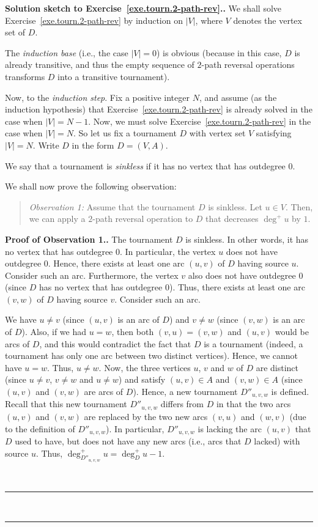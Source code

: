 \documentclass[numbers=enddot,12pt,final,onecolumn,notitlepage]{scrartcl}%
\theoremstyle{definition}
\newenvironment{statement}{\begin{quote}}{\end{quote}}
\newenvironment{proof}[1][Proof]{\noindent\textbf{#1.} }{\ \rule{0.5em}{0.5em}}
\newcommand{\abs}[1]{\left| #1 \right|}
\newcommand{\tup}[1]{\left( #1 \right)}
\begin{document}
\begin{proof}[Solution sketch to Exercise~\ref{exe.tourn.2-path-rev}.]
We shall solve Exercise~\ref{exe.tourn.2-path-rev} by induction on
$\abs{V}$, where $V$ denotes the vertex set of $D$.

The \textit{induction base} (i.e., the case $\abs{V} = 0$)
is obvious (because in this case, $D$ is already transitive, and thus
the empty sequence of $2$-path reversal operations transforms $D$ into
a transitive tournament).

Now, to the \textit{induction step}. Fix a positive
integer $N$, and assume (as the induction hypothesis) that
Exercise~\ref{exe.tourn.2-path-rev} is already solved in the case when
$\abs{V} = N-1$. Now, we must solve
Exercise~\ref{exe.tourn.2-path-rev} in the case when
$\abs{V} = N$. So let us fix a tournament $D$ with vertex set $V$
satisfying $\abs{V} = N$.
Write $D$ in the form $D = \tup{V, A}$.

We say that a tournament is \textit{sinkless} if it has no vertex that
has outdegree $0$.

We shall now prove the following observation:

\begin{statement}
\textit{Observation 1:} Assume that the tournament $D$ is sinkless.
Let $u \in V$. Then, we can apply a $2$-path reversal operation to $D$
that decreases $\deg^+ u$ by $1$.
\end{statement}
\begin{proof}[Proof of Observation 1.]
The tournament $D$ is sinkless. In other words, it has no vertex that
has outdegree $0$. In particular, the vertex $u$ does not have
outdegree $0$. Hence, there exists at least one arc $\tup{u, v}$ of
$D$ having source $u$. Consider such an arc. Furthermore, the vertex
$v$ also does not have outdegree $0$ (since $D$ has no vertex that has
outdegree $0$). Thus, there exists at least one arc $\tup{v, w}$ of
$D$ having source $v$. Consider such an arc.

We have $u \neq v$ (since $\tup{u, v}$ is an arc of $D$) and
$v \neq w$ (since $\tup{v, w}$ is an arc of $D$). Also, if we had
$u = w$, then both $\tup{v, u} = \tup{v, w}$ and $\tup{u, v}$ would
be arcs of $D$, and this would contradict the fact that $D$ is a
tournament (indeed, a tournament has only one arc between two distinct
vertices). Hence, we cannot have $u = w$. Thus, $u \neq w$.
Now, the three vertices $u$, $v$ and $w$ of $D$ are distinct (since
$u \neq v$, $v \neq w$ and $u \neq w$) and satisfy
$\tup{u, v} \in A$ and $\tup{v, w} \in A$ (since $\tup{u, v}$ and
$\tup{v, w}$ are arcs of $D$). Hence, a new tournament $D''_{u, v, w}$
is defined. Recall that this new tournament $D''_{u, v, w}$ differs
from $D$ in that the two arcs $\tup{u, v}$ and $\tup{v, w}$ are
replaced by the two new arcs $\tup{v, u}$ and $\tup{w, v}$ (due to the
definition of $D''_{u, v, w}$). In particular, $D''_{u, v, w}$ is
lacking the arc $\tup{u, v}$ that $D$ used to have, but does not have
any new arcs (i.e., arcs that $D$ lacked) with source $u$. Thus,
$\deg^+_{D''_{u, v, w}} u = \deg^+_{D} u - 1$.


\end{proof}
\end{proof}
\end{document}
